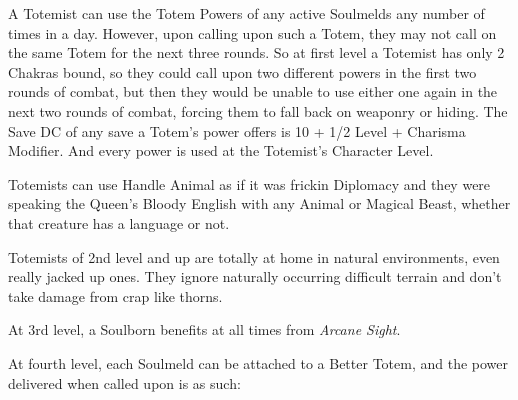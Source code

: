  A Totemist can use the Totem Powers of any active Soulmelds any number of times in a day. However, upon calling upon such a Totem, they may not call on the same Totem for the next three rounds. So at first level a Totemist has only 2 Chakras bound, so they could call upon two different powers in the first two rounds of combat, but then they would be unable to use either one again in the next two rounds of combat, forcing them to fall back on weaponry or hiding. The Save DC of any save a Totem's power offers is 10 + 1/2 Level + Charisma Modifier. And every power is used at the Totemist's Character Level.

 Totemists can use Handle Animal as if it was frickin Diplomacy and they were speaking the Queen's Bloody English with any Animal or Magical Beast, whether that creature has a language or not.


 Totemists of 2nd level and up are totally at home in natural environments, even really jacked up ones. They ignore naturally occurring difficult terrain and don't take damage from crap like thorns.

 At 3rd level, a Soulborn benefits at all times from \emph{Arcane Sight}.

 At fourth level, each Soulmeld can be attached to a Better Totem, and the power delivered when called upon is as such:

